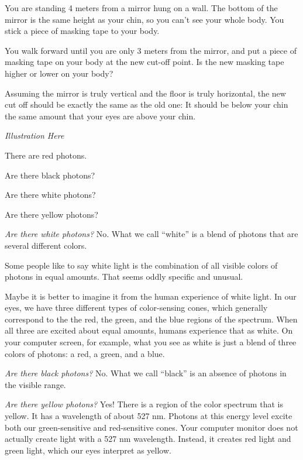 \begin{Exercise}[title={Law of Reflection}, label=law_of_reflection]

  You are standing 4 meters from a mirror hung on a wall.  The bottom
  of the mirror is the same height as your chin, so you can't see your
  whole body.  You stick a piece of masking tape to your body.

  You walk forward until you are only 3 meters from the mirror, and
  put a piece of masking tape on your body at the new cut-off point.  Is the new
  masking tape higher or lower on your body?
  
\end{Exercise}
\begin{Answer}[ref=area_of_circle]

 Assuming the mirror is truly vertical and the floor is truly
 horizontal, the new cut off should be exactly the same as the old
 one: It should be below your chin the same amount that your eyes are
 above your chin.

 \textit{Illustration Here}

\end{Answer}

\begin{Exercise}[title={Photons and Color}, label=photon_color]

  There are red photons.

  Are there black photons?

  Are there white photons?

  Are there yellow photons?
  
\end{Exercise}
\begin{Answer}
  
\textit{Are there white photons?}  No. What we call ``white'' is a
blend of photons that are several different colors.

Some people like to say white light is the combination of all visible
colors of photons in equal amounts. That seems oddly specific and unusual.

Maybe it is better to imagine it from the human experience of white
light. In our eyes, we have three different types of color-sensing
cones, which generally correspond to the the red, the green, and the
blue regions of the spectrum.  When all three are excited about equal
amounts, humans experience that as white.  On your computer screen,
for example, what you see as white is just a blend of three colors of
photons: a red, a green, and a blue.

\textit{Are there black photons?}  No. What we call ``black'' is an
absence of photons in the visible range.

\textit{Are there yellow photons?} Yes! There is a region of the color
spectrum that is yellow. It has a wavelength of about 527 nm.  Photons
at this energy level excite both our green-sensitive and red-sensitive
cones.
Your computer monitor does not actually create light with a 527 nm
wavelength. Instead, it creates red light and green light, which our
eyes interpret as yellow.

\end{Answer}

